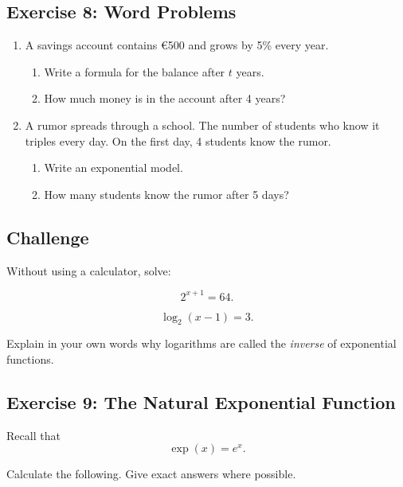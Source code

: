 \documentclass[a4paper, 11pt]{article}
\begin{document}
\subsection*{Exercise 8: Word Problems}

\begin{enumerate}
    \item A savings account contains €500 and grows by 5\% every year.
    \begin{enumerate}
        \item Write a formula for the balance after $t$ years.
        \item How much money is in the account after 4 years?
    \end{enumerate}

    \vspace{1cm}

    \item A rumor spreads through a school. The number of students who know it triples every day. On the first day, 4 students know the rumor.
    \begin{enumerate}
        \item Write an exponential model.
        \item How many students know the rumor after 5 days?
    \end{enumerate}
\end{enumerate}

\subsection*{Challenge}

Without using a calculator, solve:

\[
2^{x+1}=64.
\]

\vspace{1cm}

\[
\log_2(x-1)=3.
\]

\vspace{1cm}

Explain in your own words why logarithms are called the \emph{inverse} of exponential functions.

\subsection*{Exercise 9: The Natural Exponential Function}

Recall that
\[
\exp(x)=e^x.
\]

Calculate the following. Give exact answers where possible.
\end{document}
